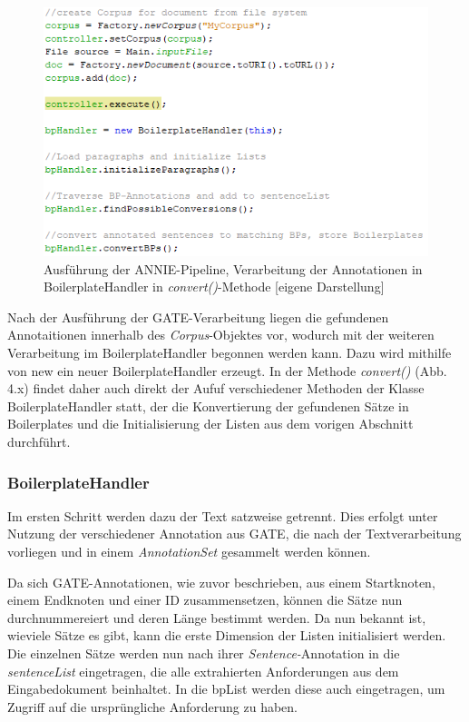 \documentclass[12pt]{report}
\begin{document}
\begin{figure}[h!]
\begin{center}
\includegraphics[scale=1]{Bilder/AnnieHandler-execute.png}
\caption{Ausführung der ANNIE-Pipeline, Verarbeitung der Annotationen in BoilerplateHandler in \textit{convert()}-Methode [eigene Darstellung]}
\end{center}
\end{figure}

Nach der Ausführung der GATE-Verarbeitung liegen die gefundenen Annotaitionen innerhalb des \textit{Corpus}-Objektes vor, wodurch mit der weiteren Verarbeitung im BoilerplateHandler begonnen werden kann. Dazu wird mithilfe von new ein neuer BoilerplateHandler erzeugt.
In der Methode \textit{convert()} (Abb. 4.x) findet daher auch direkt der Aufuf verschiedener Methoden der Klasse BoilerplateHandler statt, der die Konvertierung der gefundenen Sätze in Boilerplates und die Initialisierung der Listen aus dem vorigen Abschnitt durchführt. 

\subsubsection{BoilerplateHandler}
Im ersten Schritt werden dazu der Text satzweise getrennt. Dies erfolgt unter Nutzung der verschiedener Annotation aus GATE, die nach der Textverarbeitung vorliegen und in einem \textit{AnnotationSet} gesammelt werden können.

Da sich GATE-Annotationen, wie zuvor beschrieben, aus einem Startknoten, einem Endknoten und einer ID zusammensetzen, können die Sätze nun durchnummereiert und deren Länge bestimmt werden. Da nun bekannt ist, wieviele Sätze es gibt, kann die erste Dimension der Listen initialisiert werden. Die einzelnen Sätze werden nun nach ihrer \textit{Sentence-}Annotation in die \textit{sentenceList} eingetragen, die alle extrahierten Anforderungen aus dem Eingabedokument beinhaltet. In die bpList werden diese auch eingetragen, um Zugriff auf die ursprüngliche Anforderung zu haben. 
\end{document}

